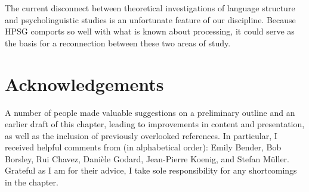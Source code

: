 \documentclass[a4paper]{article}
\begin{document}
The current disconnect between theoretical investigations of language structure and psycholinguistic studies is an unfortunate feature of our discipline.  Because HPSG comports so well with what is known about processing, it could serve as the basis for a reconnection between these two areas of study.

\section*{Acknowledgements}

A number of people made valuable suggestions on a preliminary outline and an earlier draft of this
chapter, leading to improvements in content and presentation, as well as the inclusion of previously
overlooked references.  In particular, I received helpful comments from (in alphabetical order):
Emily Bender, Bob Borsley, Rui Chavez, Danièle Godard, Jean-Pierre Koenig, and Stefan Müller.
Grateful as I am for their advice, I take sole responsibility for any shortcomings in the chapter. 

{\sloppy
\printbibliography[heading=subbibliography,notkeyword=this] 
}
\end{document}
